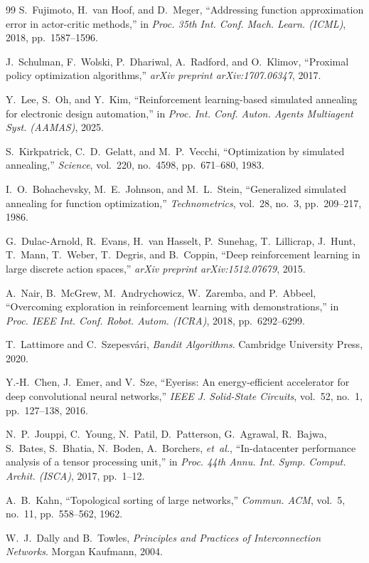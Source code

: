 \documentclass[10pt,conference]{IEEEtran}
\begin{document}
\begin{thebibliography}{99}
S.~Fujimoto, H.~van Hoof, and D.~Meger,
``Addressing function approximation error in actor-critic methods,''
in \emph{Proc. 35th Int. Conf. Mach. Learn. (ICML)}, 2018, pp.~1587--1596.

J.~Schulman, F.~Wolski, P.~Dhariwal, A.~Radford, and O.~Klimov,
``Proximal policy optimization algorithms,''
\emph{arXiv preprint arXiv:1707.06347}, 2017.

Y.~Lee, S.~Oh, and Y.~Kim,
``Reinforcement learning-based simulated annealing for electronic design automation,''
in \emph{Proc. Int. Conf. Auton. Agents Multiagent Syst. (AAMAS)}, 2025.

S.~Kirkpatrick, C.~D.~Gelatt, and M.~P.~Vecchi,
``Optimization by simulated annealing,''
\emph{Science}, vol.~220, no.~4598, pp.~671--680, 1983.

I.~O.~Bohachevsky, M.~E.~Johnson, and M.~L.~Stein,
``Generalized simulated annealing for function optimization,''
\emph{Technometrics}, vol.~28, no.~3, pp.~209--217, 1986.

G.~Dulac-Arnold, R.~Evans, H.~van Hasselt, P.~Sunehag, T.~Lillicrap, J.~Hunt, T.~Mann, T.~Weber, T.~Degris, and B.~Coppin,
``Deep reinforcement learning in large discrete action spaces,''
\emph{arXiv preprint arXiv:1512.07679}, 2015.

A.~Nair, B.~McGrew, M.~Andrychowicz, W.~Zaremba, and P.~Abbeel,
``Overcoming exploration in reinforcement learning with demonstrations,''
in \emph{Proc. IEEE Int. Conf. Robot. Autom. (ICRA)}, 2018, pp.~6292--6299.

T.~Lattimore and C.~Szepesv{\'a}ri,
\emph{Bandit Algorithms}. Cambridge University Press, 2020.

Y.-H.~Chen, J.~Emer, and V.~Sze,
``Eyeriss: An energy-efficient accelerator for deep convolutional neural networks,''
\emph{IEEE J. Solid-State Circuits}, vol.~52, no.~1, pp.~127--138, 2016.

N.~P.~Jouppi, C.~Young, N.~Patil, D.~Patterson, G.~Agrawal, R.~Bajwa, S.~Bates, S.~Bhatia, N.~Boden, A.~Borchers, \emph{et~al.},
``In-datacenter performance analysis of a tensor processing unit,''
in \emph{Proc. 44th Annu. Int. Symp. Comput. Archit. (ISCA)}, 2017, pp.~1--12.

A.~B.~Kahn,
``Topological sorting of large networks,''
\emph{Commun. ACM}, vol.~5, no.~11, pp.~558--562, 1962.

W.~J.~Dally and B.~Towles,
\emph{Principles and Practices of Interconnection Networks}. Morgan Kaufmann, 2004.

\end{thebibliography}
\end{document}
